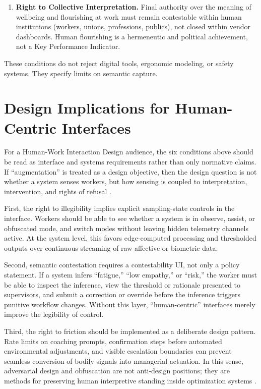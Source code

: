 \documentclass[runningheads]{llncs}
\begin{document}
\begin{enumerate}
\item \textbf{Right to Collective Interpretation.} Final authority over the meaning of wellbeing and flourishing at work must remain contestable within human institutions (workers, unions, professions, publics), not closed within vendor dashboards. Human flourishing is a hermeneutic and political achievement, not a Key Performance Indicator.
\end{enumerate}

These conditions do not reject digital tools, ergonomic modeling, or safety systems. They specify limits on semantic capture.

\section{Design Implications for Human-Centric Interfaces}

For a Human-Work Interaction Design audience, the six conditions above should be read as interface and systems requirements rather than only normative claims. If ``augmentation'' is treated as a design objective, then the design question is not whether a system senses workers, but how sensing is coupled to interpretation, intervention, and rights of refusal \cite{hwid2026cfp}.

First, the right to illegibility implies explicit sampling-state controls in the interface. Workers should be able to see whether a system is in observe, assist, or obfuscated mode, and switch modes without leaving hidden telemetry channels active. At the system level, this favors edge-computed processing and thresholded outputs over continuous streaming of raw affective or biometric data.

Second, semantic contestation requires a contestability UI, not only a policy statement. If a system infers ``fatigue,'' ``low empathy,'' or ``risk,'' the worker must be able to inspect the inference, view the threshold or rationale presented to supervisors, and submit a correction or override before the inference triggers punitive workflow changes. Without this layer, ``human-centric'' interfaces merely improve the legibility of control.

Third, the right to friction should be implemented as a deliberate design pattern. Rate limits on coaching prompts, confirmation steps before automated environmental adjustments, and visible escalation boundaries can prevent seamless conversion of bodily signals into managerial actuation. In this sense, adversarial design and obfuscation are not anti-design positions; they are methods for preserving human interpretive standing inside optimization systems \cite{disalvo2012adversarial,nissenbaum2015obfuscation}.
\end{document}
